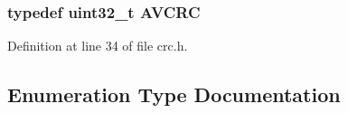 \subsubsection[{\texorpdfstring{A\+V\+C\+RC}{AVCRC}}]{\setlength{\rightskip}{0pt plus 5cm}typedef {\bf uint32\+\_\+t} {\bf A\+V\+C\+RC}}\hypertarget{group__lavu__crc32_gad7b1134679f68f2d4a52edaf1441e38f}{}\label{group__lavu__crc32_gad7b1134679f68f2d4a52edaf1441e38f}


Definition at line 34 of file crc.\+h.



\subsection{Enumeration Type Documentation}
